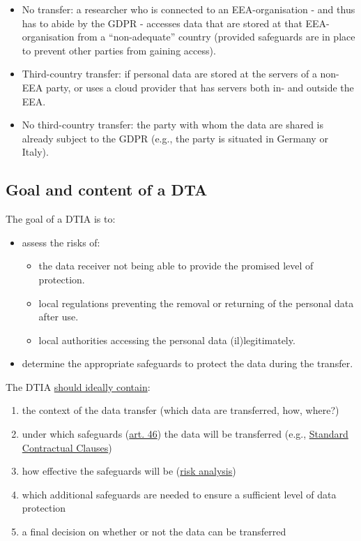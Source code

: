 \documentclass[
]{book}
\providecommand{\tightlist}{%
  \setlength{\itemsep}{0pt}\setlength{\parskip}{0pt}}
\begin{document}
\begin{itemize}
\tightlist
\item
  No transfer: a researcher who is connected to an EEA-organisation - and thus
  has to abide by the GDPR - accesses data that are stored at that EEA-organisation
  from a ``non-adequate'' country (provided safeguards are in place to prevent other
  parties from gaining access).
\item
  Third-country transfer: if personal data are stored at the servers of a
  non-EEA party, or uses a cloud provider that has servers both in- and outside
  the EEA.
\item
  No third-country transfer: the party with whom the data are shared is already
  subject to the GDPR (e.g., the party is situated in Germany or Italy).
\end{itemize}

\hypertarget{dtia-goal-content}{%
\subsection{Goal and content of a DTA}\label{dtia-goal-content}}

The goal of a DTIA is to:

\begin{itemize}
\tightlist
\item
  assess the risks of:

  \begin{itemize}
  \tightlist
  \item
    the data receiver not being able to provide the promised level of protection.
  \item
    local regulations preventing the removal or returning of the personal data after use.
  \item
    local authorities accessing the personal data (il)legitimately.
  \end{itemize}
\item
  determine the appropriate safeguards to protect the data during the transfer.
\end{itemize}

The DTIA \href{https://edpb.europa.eu/system/files/2021-06/edpb_recommendations_202001vo.2.0_supplementarymeasurestransferstools_en.pdf}{should ideally contain}:

\begin{enumerate}
\def\labelenumi{\arabic{enumi}.}
\tightlist
\item
  the context of the data transfer (which data are transferred, how, where?)
\item
  under which safeguards (\href{https://gdpr-info.eu/art-46-gdpr/}{art. 46})
  the data will be transferred (e.g., \protect\hyperlink{scc}{Standard Contractual Clauses})
\item
  how effective the safeguards will be (\protect\hyperlink{risk-assessment}{risk analysis})
\item
  which additional safeguards are needed to ensure a sufficient level of data protection
\item
  a final decision on whether or not the data can be transferred
\end{enumerate}
\end{document}
